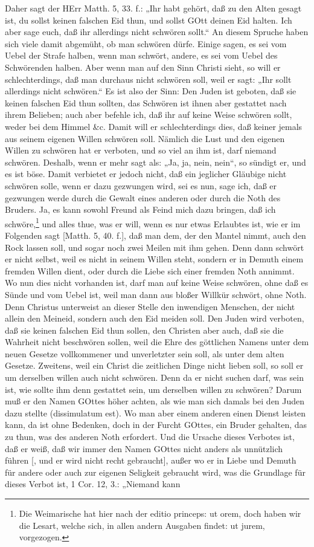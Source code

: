 Daher sagt der HErr Matth. 5, 33. f.: „Ihr habt gehört, daß zu den Alten gesagt ist, du sollst keinen falschen Eid thun, und sollst GOtt deinen Eid halten. Ich aber sage euch, daß ihr allerdings nicht schwören sollt.“ An diesem Spruche haben sich viele damit abgemüht, ob man schwören dürfe. Einige sagen, es sei vom Uebel der Strafe halben, wenn man schwört, andere, es sei vom Uebel des Schwörenden halben. Aber wenn man auf den Sinn Christi sieht, so will er schlechterdings, daß man durchaus nicht schwören soll, weil er sagt: „Ihr sollt allerdings nicht schwören.“ Es ist also der Sinn: Den Juden ist geboten, daß sie keinen falschen Eid thun sollten, das Schwören ist ihnen aber gestattet nach ihrem Belieben; auch aber befehle ich, daß ihr auf keine Weise schwören sollt, weder bei dem Himmel \&c. Damit will er schlechterdings dies, daß keiner jemals aus seinem eigenen Willen schwören soll. Nämlich die Lust und den eigenen Willen zu schwören hat er verboten, und so viel an ihm ist, darf niemand schwören. Deshalb, wenn er mehr sagt als: „Ja, ja, nein, nein“, so sündigt er, und es ist böse. Damit verbietet er jedoch nicht, daß ein jeglicher Gläubige nicht schwören solle, wenn er dazu gezwungen wird, sei es nun, sage ich, daß er gezwungen werde durch die Gewalt eines anderen oder durch die Noth des Bruders. Ja, es kann sowohl Freund als Feind mich dazu bringen, daß ich schwöre,\footnote{Die Weimarische hat hier nach der editio princeps: ut orem, doch haben wir die Lesart, welche sich, in allen andern Ausgaben findet: ut jurem, vorgezogen.} und alles thue, was er will, wenn es nur etwas Erlaubtes ist, wie er im Folgenden sagt [Matth. 5, 40. f.], daß man dem, der den Mantel nimmt, auch den Rock lassen soll, und sogar noch zwei Meilen mit ihm gehen. Denn dann schwört er nicht selbst, weil es nicht in seinem Willen steht, sondern er in Demuth einem fremden Willen dient, oder durch die Liebe sich einer fremden Noth annimmt. Wo nun dies nicht vorhanden ist, darf man auf keine Weise schwören, ohne daß es Sünde und vom Uebel ist, weil man dann aus bloßer Willkür schwört, ohne Noth. Denn Christus unterweist an dieser Stelle den inwendigen Menschen, der nicht allein den Meineid, sondern auch den Eid meiden soll. Den Juden wird verboten, daß sie keinen falschen Eid thun sollen, den Christen aber auch, daß sie die Wahrheit nicht beschwören sollen, weil die Ehre des göttlichen Namens unter dem neuen Gesetze vollkommener und unverletzter sein soll, als unter dem alten Gesetze. Zweitens, weil ein Christ die zeitlichen Dinge nicht lieben soll, so soll er um derselben willen auch nicht schwören. Denn da er nicht suchen darf, was sein ist, wie sollte ihm denn gestattet sein, um derselben willen zu schwören? Darum muß er den Namen GOttes höher achten, als wie man sich damals bei den Juden dazu stellte (dissimulatum est). Wo man aber einem anderen einen Dienst leisten kann, da ist ohne Bedenken, doch in der Furcht GOttes, ein Bruder gehalten, das zu thun, was des anderen Noth erfordert. Und die Ursache dieses Verbotes ist, daß er weiß, daß wir immer den Namen GOttes nicht anders als unnützlich führen [, und er wird nicht recht gebraucht], außer wo er in Liebe und Demuth für andere oder auch zur eigenen Seligkeit gebraucht wird, was die Grundlage für dieses Verbot ist, 1 Cor. 12, 3.: „Niemand kann 